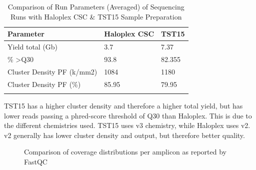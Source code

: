 \begin{table}[!htbp]
    \caption[ISV]{Comparison of Run Parameters (Averaged) of Sequencing Runs with Haloplex CSC \& TST15 Sample Preparation}
    \centering
    \begin{tabular}{ |p{4.5cm}|p{2cm}|p{2cm}|}
    \hline
    Parameter & Haloplex CSC & TST15 \\ \hline
    Yield total (Gb) & 3.7 & 7.37 \\
    \% \textgreater Q30 & 93.8 & 82.355 \\
    Cluster Density PF (k/mm2) & 1084 & 1180  \\
    Cluster Density PF (\%) & 85.95 & 79.95 \\
    \hline
    \label{sequencing_viewer}
  \end{tabular}
\end{table}

TST15 has a higher cluster density and therefore a higher total yield, but has
lower reads passing a phred-score threshold of Q30 than Haloplex. This is due to
the different chemistries used. TST15 uses v3 chemistry, while Haloplex uses v2.
v2 generally has lower cluster density and output, but therefore better quality.

\begin{figure}[!tbp]
  \centering
  \hfill
  \caption{Comparison of coverage distributions per amplicon as reported by FastQC}
\end{figure}


